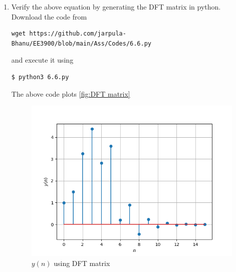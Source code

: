 \documentclass[journal,12pt,twocolumn]{IEEEtran}
\renewcommand\thesection{\arabic{section}}
\begin{document}
\begin{enumerate}[label=\thesection.\arabic*
,ref=\thesection.\theenumi]
\begin{align}
	\mtx{X} = \mtx{W}\mtx{x} = \mtx{x}\mtx{W}
\end{align}
\noindent where
\begin{align}
	\mtx{x} = 
	\begin{pmatrix}
		x(0) \\ x(1) \\ \vdots \\ x(n - 1)
	\end{pmatrix}
\end{align}
\noindent Using \eqref{6.3}, the inverse Fourier Transform is given by
\begin{align}
	\mtx{x} = \mathcal{F}^{-1}\brak{\mtx{X}} = \mtx{W}^{-1}\mtx{X} &= \frac{1}{N}\mtx{W^{H}}\mtx{X} = \frac{1}{N}\mtx{X}\mtx{W^{H}} \\ 
	\implies \mtx{W}^{-1} &= \frac{1}{N}\mtx{W^{H}}
\end{align}
\noindent where $H$ denotes hermitian operator. We can rewrite \eqref{6.2} using the element-wise multiplication operator as
\begin{align}
	\mtx{Y} = \mtx{H}\cdot\mtx{X} = \brak{\mtx{W}\mtx{h}}\cdot\brak{\mtx{W}\mtx{x}}
\end{align}
\item Verify the above equation by generating the DFT matrix in python.\\
\solution Download the code from
\begin{lstlisting}
wget https://github.com/jarpula-Bhanu/EE3900/blob/main/Ass/Codes/6.6.py
\end{lstlisting}
and execute it using
\begin{lstlisting}
$ python3 6.6.py
\end{lstlisting}

The above code plots \eqref{fig:DFT matrix}
\begin{figure}
\centering
\includegraphics[width=\columnwidth]{figs/6.6.png}
\caption{$y(n)$ using DFT matrix}
\label{fig:DFT matrix}
\end{figure}


\end{enumerate}
\end{document}
